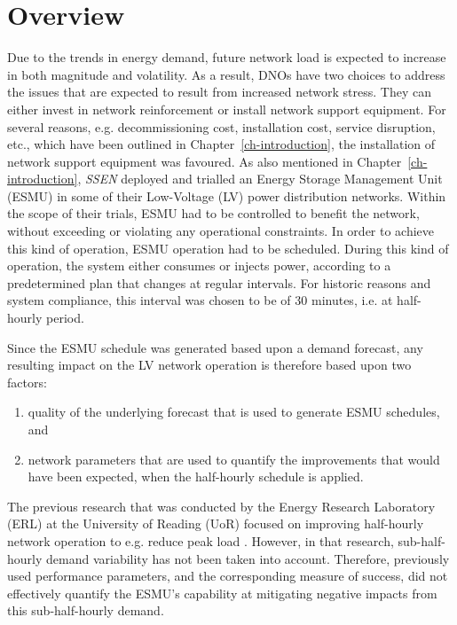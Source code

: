 \section{Overview}
\label{ch1:sec:overview}

Due to the trends in energy demand, future network load is expected to increase in both magnitude and volatility.
As a result, DNOs have two choices to address the issues that are expected to result from increased network stress.
They can either invest in network reinforcement or install network support equipment.
For several reasons, e.g. decommissioning cost, installation cost, service disruption, etc., which have been outlined in Chapter~\ref{ch-introduction}, the installation of network support equipment was favoured.
As also mentioned in Chapter~\ref{ch-introduction}, \textit{SSEN} deployed and trialled an Energy Storage Management Unit (ESMU) in some of their Low-Voltage (LV) power distribution networks.
Within the scope of their trials, ESMU had to be controlled to benefit the network, without exceeding or violating any operational constraints.
In order to achieve this kind of operation, ESMU operation had to be scheduled.
During this kind of operation, the system either consumes or injects power, according to a predetermined plan that changes at regular intervals.
For historic reasons and system compliance, this interval was chosen to be of 30 minutes, i.e. at half-hourly period.

Since the ESMU schedule was generated based upon a demand forecast, any resulting impact on the LV network operation is therefore based upon two factors:

\begin{enumerate}
	\item quality of the underlying forecast that is used to generate ESMU schedules, and
	\item network parameters that are used to quantify the improvements that would have been expected, when the half-hourly schedule is applied.
\end{enumerate}


The previous research that was conducted by the Energy Research Laboratory (ERL) at the University of Reading (UoR) focused on improving half-hourly network operation to e.g. reduce peak load \cite{Rowe2014a, Yunusov2011}.
However, in that research, sub-half-hourly demand variability has not been taken into account.
Therefore, previously used performance parameters, and the corresponding measure of success, did not effectively quantify the ESMU's capability at mitigating negative impacts from this sub-half-hourly demand.

